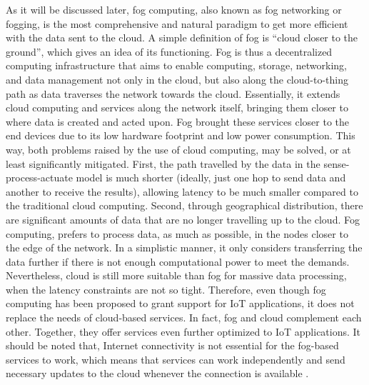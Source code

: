 \noindent\tab As it will be discussed later, fog computing, also known as fog networking or fogging, is the most comprehensive and natural paradigm to get more efficient with the data sent to the cloud. A simple definition of fog is ``cloud closer to the ground'', which gives an idea of its functioning. Fog is thus a decentralized computing infrastructure that aims to enable computing, storage, networking, and data management not only in the cloud, but also along the cloud-to-thing path as data traverses the network towards the cloud. Essentially, it extends cloud computing and services along the network itself, bringing them closer to where data is created and acted upon. Fog brought these services closer to the end devices due to its low hardware footprint and low power consumption. This way, both problems raised by the use of cloud computing, may be solved, or at least significantly mitigated. First, the path travelled by the data in the sense-process-actuate model is much shorter (ideally, just one hop to send data and another to receive the results), allowing latency to be much smaller compared to the traditional cloud computing. Second, through geographical distribution, there are significant amounts of data that are no longer travelling up to the cloud. Fog computing, prefers to process data, as much as possible, in the nodes closer to the edge of the network. In a simplistic manner, it only considers transferring the data further if there is not enough computational power to meet the demands.\\
\noindent\tab Nevertheless, cloud is still more suitable than fog for massive data processing, when the latency constraints are not so tight. Therefore, even though fog computing has been proposed to grant support for IoT applications, it does not replace the needs of cloud-based services. In fact, fog and cloud complement each other. Together, they offer services even further optimized to IoT applications. It should be noted that, Internet connectivity is not essential for the fog-based services to work, which means that services can work independently and send necessary updates to the cloud whenever the connection is available \cite{yousefpour2018all}.\\
